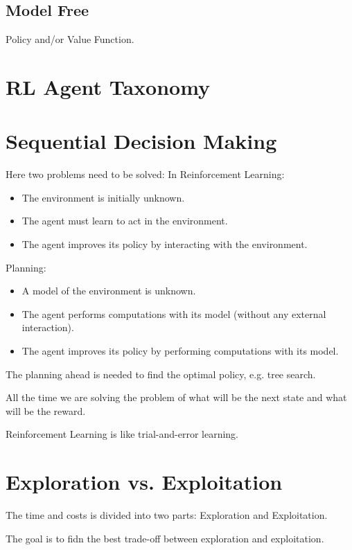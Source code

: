 \subsection{Model Free}
Policy and/or Value Function.


\section{RL Agent Taxonomy}


\section{Sequential Decision Making}
Here two problems need to be solved:
In Reinforcement Learning:
\begin{itemize}
    \item The environment is initially unknown.
    \item The agent must learn to act in the environment.
    \item The agent improves its policy by interacting with the environment.
\end{itemize}

Planning:
\begin{itemize}
    \item A model of the environment is unknown.
    \item The agent performs computations with its model (without any external interaction).
    \item The agent improves its policy by performing computations with its model.
\end{itemize}

The planning ahead is needed to find the optimal policy, e.g. tree search.

All the time we are solving the problem of what will be the next state and what will be the reward.

Reinforcement Learning is like trial-and-error learning.


\section{Exploration vs. Exploitation}\label{sec:exploration-vs.-exploitation}
The time and costs is divided into two parts: Exploration and Exploitation.

The goal is to fidn the best trade-off between exploration and exploitation.

